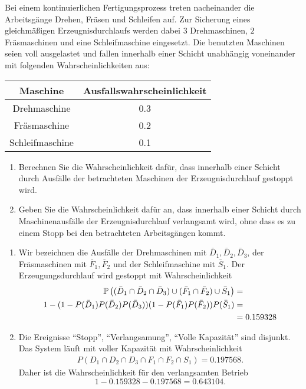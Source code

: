 Bei einem kontinuierlichen Fertigungsprozess treten nacheinander die
Arbeits\-gän\-ge Drehen, Fräsen und Schleifen auf. Zur Sicherung eines
gleichmäßigen Erzeugnisdurchlaufs werden dabei $3$ Drehmaschinen, $2$ Fräsmaschinen
und eine Schleifmaschine eingesetzt. Die benutzten Maschinen seien voll
ausgelastet und fallen innerhalb einer Schicht unabhängig voneinander mit
folgenden Wahrscheinlichkeiten aus:
\begin{center}
\begin{tabular}{c|c}
Maschine& Ausfallswahrscheinlichkeit \\ \hline
Drehmaschine & 0.3 \\
Fräsmaschine & 0.2 \\
Schleifmaschine & 0.1
\end{tabular}
\end{center}
\begin{enumerate}
\item Berechnen Sie die Wahrscheinlichkeit dafür, dass innerhalb einer Schicht
    durch Ausfälle der betrachteten Maschinen der Erzeugnisdurchlauf gestoppt
    wird.
\item Geben Sie die Wahrscheinlichkeit dafür an, dass innerhalb einer Schicht
    durch Maschinenausfälle der Erzeugnisdurchlauf verlangsamt wird, ohne dass
    es zu einem Stopp bei den betrachteten Arbeitsgängen kommt.
\end{enumerate}

\solution
\begin{enumerate}
    \item Wir bezeichnen die Ausfälle der Drehmaschinen mit $\bar D_1, \bar
        D_2, \bar D_3$, der Fräsmaschinen mit $\bar F_1, \bar F_2$ und der
        Schleifmaschine mit $\bar S_1$. Der Erzeugungsdurchlauf wird gestoppt
        mit Wahrscheinlichkeit
        \begin{align*}
            \mathbb P \left( (\bar D_1 \cap \bar D_2 \cap \bar D_3 ) \cup ( \bar F_1 \cap \bar F_2) \cup \bar S_1 \right) &=  \\
            1 - ( 1 - P(\bar D_1)P(\bar D_2)P(\bar D_3))(1- P(\bar F_1)P(\bar F_2))P(\bar S_1) &= \\
            &= 0.159328
        \end{align*}
    \item Die Ereignisse ``Stopp'', ``Verlangsamung'', ``Volle Kapazität'' sind disjunkt. 
        Das System läuft mit voller Kapazität mit Wahrscheinlichkeit
        \begin{align*}
            P( D_1 \cap D_2 \cap D_3 \cap F_1 \cap F_2 \cap S_1 ) = 0.197568.
        \end{align*}
        Daher ist die Wahrscheinlichkeit für den verlangsamten Betrieb
        \begin{equation*}
            1 - 0.159328 - 0.197568 = 0.643104.
        \end{equation*}
\end{enumerate} 


